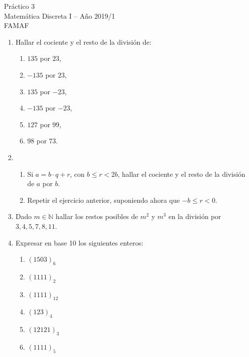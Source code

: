 \documentclass[12pt,spanish,makeidx]{amsbook}
\begin{document}
{\bf \begin{center} Práctico 3 \\ Matemática Discreta I -- Año 2019/1 \\ FAMAF \end{center}}

\smallskip


\begin{enumerate}


\smallskip

\item Hallar el cociente y el resto de la división de:

\begin{multicols}{3}
\begin{enumerate}
  \item $135$ por $23$,
	\item $-135$ por $23$,
	\item $135$ por $-23$,
  \item $-135$ por $-23$,
	\item $127$ por $99$,
	\item $98$ por $73$.
\end{enumerate}
\end{multicols}

\smallskip

\item 
\begin{enumerate}
  \item Si $a=b\cdot q+r$, con $b \le r <2 b$, hallar el cociente y el resto de la división de $a$ por $b$.
  \item Repetir el ejercicio anterior, suponiendo ahora que $-b \le r < 0$.
\end{enumerate}


\smallskip
\item Dado $m\in \mathbb N$ hallar los restos posibles de $m^2$ y $m^3$ en la división por $3,4,5,7,8, 11$.

\smallskip
\item Expresar en base 10 los siguientes enteros:
\begin{multicols}{3}
\begin{enumerate}
	\item $(1503)_6$ 
	\item $(1111)_2$ 
	\item $(1111)_{12}$
	\item $(123)_4$ 
	\item $(12121)_3$
	\item $(1111)_5$
\end{enumerate}
\end{multicols}


\end{enumerate}
\end{document}
